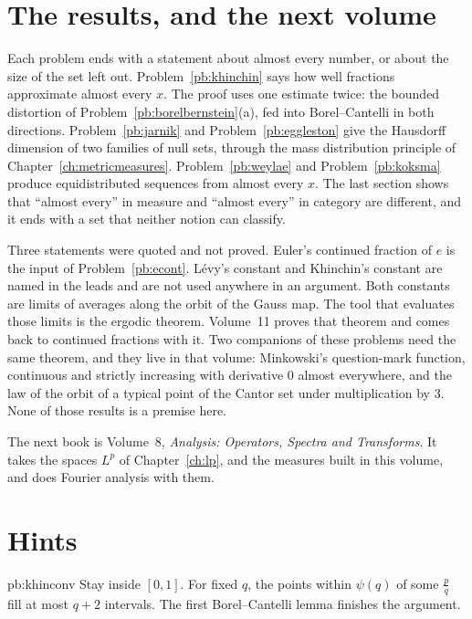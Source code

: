 \section{The results, and the next volume}

Each problem ends with a statement about almost every number, or about the size of the set left out. Problem~\ref{pb:khinchin} says how well fractions approximate almost every $x$. The proof uses one estimate twice: the bounded distortion of Problem~\ref{pb:borelbernstein}(a), fed into Borel--Cantelli in both directions. Problem~\ref{pb:jarnik} and Problem~\ref{pb:eggleston} give the Hausdorff dimension of two families of null sets, through the mass distribution principle of Chapter~\ref{ch:metricmeasures}. Problem~\ref{pb:weylae} and Problem~\ref{pb:koksma} produce equidistributed sequences from almost every $x$. The last section shows that ``almost every'' in measure and ``almost every'' in category are different, and it ends with a set that neither notion can classify.

Three statements were quoted and not proved. Euler's continued fraction of $e$ is the input of Problem~\ref{pb:econt}. Lévy's constant and Khinchin's constant are named in the leads and are not used anywhere in an argument. Both constants are limits of averages along the orbit of the Gauss map. The tool that evaluates those limits is the ergodic theorem. Volume~11 proves that theorem and comes back to continued fractions with it. Two companions of these problems need the same theorem, and they live in that volume: Minkowski's question-mark function, continuous and strictly increasing with derivative $0$ almost everywhere, and the law of the orbit of a typical point of the Cantor set under multiplication by $3$. None of those results is a premise here.

The next book is Volume~8, \emph{Analysis: Operators, Spectra and Transforms}. It takes the spaces $L^p$ of Chapter~\ref{ch:lp}, and the measures built in this volume, and does Fourier analysis with them.

\section*{Hints}

\begin{hint}{pb:khinconv}
Stay inside $[0,1]$. For fixed $q$, the points within $\psi(q)$ of some $\frac pq$ fill at most $q+2$ intervals. The first Borel--Cantelli lemma finishes the argument.
\end{hint}

